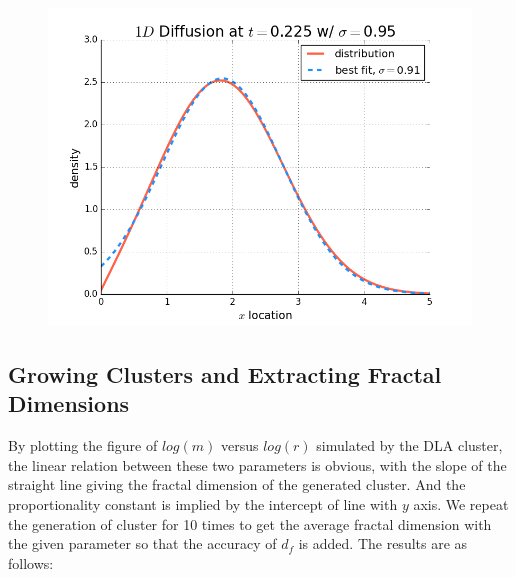 \documentclass[12pt]{article}
\begin{document}
\begin{figure}[!htb]
  \caption{}\label{fig:probdensity5}
\endminipage\hfill
{}
  \includegraphics[width=\linewidth]{probdensityt2000.png}
  \caption{}\label{fig:probdensity6}
\endminipage\hfill
\end{figure}

\subsection{Growing Clusters and Extracting Fractal Dimensions}
\label{sec:clustersandfractals}


By plotting the figure of $log(m)$ versus $log(r)$ simulated by the DLA cluster, the linear relation between these two parameters is obvious, with the slope of the straight line giving the fractal dimension of the generated cluster. And the proportionality constant is implied by the intercept of line with $y$ axis. We repeat the generation of cluster for 10 times to get the average fractal dimension with the given parameter so that the accuracy of $d_f$ is added. The results are as follows:

\end{document}
